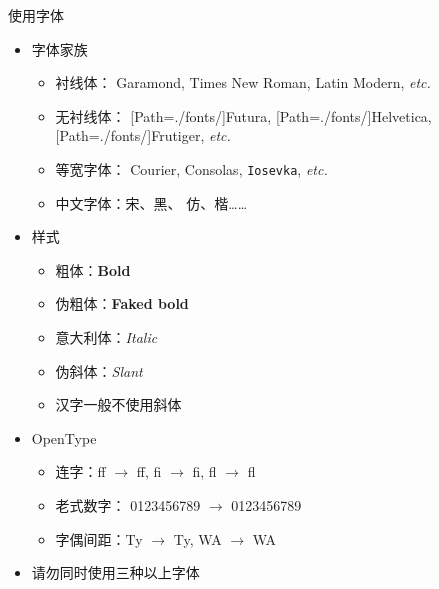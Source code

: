 \begin{frame}{使用字体}
\begin{itemize}
  \item<1-> 字体家族
    \begin{itemize}
      \item 衬线体：
        {Garamond},
        {Times New Roman},
        {Latin Modern}, \emph{etc.}
      \item 无衬线体：
        {[Path=./fonts/]Futura},
        {[Path=./fonts/]Helvetica},
        {[Path=./fonts/]Frutiger}, \emph{etc.}
      \item 等宽字体：
        {Courier},
        {Consolas},
        \texttt{Iosevka}, \emph{etc.}
      \item 中文字体：宋、{黑}、
        {仿}、{楷}……
    \end{itemize}
  \item<2-> 样式
    \begin{itemize}
      \item 粗体：\textbf{Bold}
      \item 伪粗体：{\textbf{Faked bold}}
      \item 意大利体：\textit{Italic}
      \item 伪斜体：{\textsl{Slant}}
      \item<3-> \alert{汉字一般不使用斜体}
    \end{itemize}
  \item<4-> OpenType
    \begin{itemize}
      \item 连字：{f}{f} $\to$ ff, {f}{i} $\to$ fi, {f}{l} $\to$ fl
      \item 老式数字：
        0123456789 $\to$ {0123456789}
      \item 字偶间距：{T}{y} $\to$ Ty, {W}{A} $\to$ WA
    \end{itemize}
  \item<5-> \alert{请勿同时使用三种以上字体}
\end{itemize}
\vspace{-0.2cm}
\end{frame}
